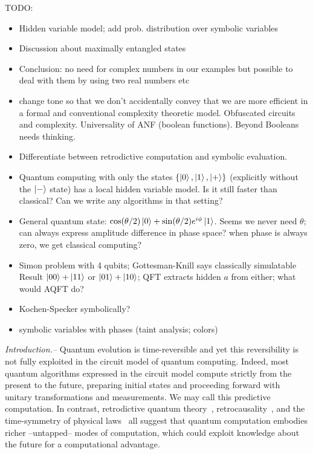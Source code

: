 \documentclass[aps,prl,twocolumn,superscriptaddress,floatfix,notitlepage]{revtex4-2}
\begin{document}
TODO:
\begin{itemize}
\item Hidden variable model; add prob. distribution over symbolic variables
    \item Discussion about maximally entangled states
    \item Conclusion: no need for complex numbers in our examples but possible to deal with them by using two real numbers etc
    \item change tone so that we don't accidentally convey that we are more efficient in a formal and conventional complexity theoretic model. Obfuscated circuits and complexity. Universality of ANF (boolean functions). Beyond Booleans needs thinking. 
    \item Differentiate between retrodictive computation and symbolic evaluation. 
\item Quantum computing with only the states $\{\ket{0}, \ket{1}, \ket{+}\}$  (explicitly without the $\ket{-}$ state) has a local hidden variable model. Is it still faster than classical? Can we write any algorithms in that setting?
\item General quantum state: $\cos(\theta/2) \ket{0} + \sin(\theta/2) e^{i\phi} \ket{1}$. Seems we never need $\theta$; can always express amplitude difference in phase space? when phase is always zero, we get classical computing?
  \item Simon problem with 4 qubits; Gottesman-Knill says classically
    simulatable Result $\ket{00}+\ket{11}$ or $\ket{01}+\ket{10}$; QFT
    extracts hidden $a$ from either; what would AQFT do?
    \item Kochen-Specker symbolically?
    \item symbolic variables with phases (taint analysis; colors)
\end{itemize}

{\it Introduction.--} Quantum evolution is time-reversible and yet this reversibility 
is not fully exploited in the circuit model of quantum
computing. Indeed, most quantum algorithms expressed in the circuit
model compute strictly from the present to the future, preparing
initial states and proceeding forward with unitary transformations and
measurements. We may call this predictive computation. In contrast, retrodictive quantum
theory~\cite{sym13040586}, retrocausality~\cite{Aharonov2008}, and the
time-symmetry of physical laws~\cite{RevModPhys.27.179} all suggest
that quantum computation embodies richer --untapped-- modes of
computation, which could exploit knowledge about the future for a
computational advantage.
\end{document}
